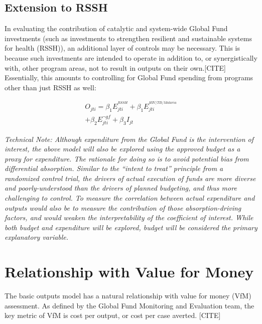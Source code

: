 \documentclass[twocolumn]{bmcart}%
\begin{document}
\subsection{Extension to RSSH}
In evaluating the contribution of catalytic and system-wide Global Fund investments (such as investments to strengthen resilient and sustainable systems for health (RSSH)), an additional layer of controls may be necessary. This is because such investments are intended to operate in addition to, or synergistically with, other program areas, not to result in outputs on their own.[CITE] %
 Essentially, this amounts to controlling for Global Fund spending from programs other than just RSSH as well:

  \begin{align}
    O_{jti} = \beta_1 E^{^{RSSH}}_{jti} + \beta_1 E^{^{HIV/TB/Malaria}}_{jti} \\
    + \beta_2 E^{\neg gf}_{jti} + \beta_3 I_{jt}
  \end{align}

\textit{Technical Note: Although expenditure from the Global Fund is the intervention of interest, the above model will also be explored using the approved budget as a proxy for expenditure. The rationale for doing so is to avoid potential bias from differential absorption. Similar to the ``intent to treat'' principle from a randomized control trial, the drivers of actual execution of funds are more diverse and poorly-understood than the drivers of planned budgeting, and thus more challenging to control. To measure the correlation between actual expenditure and outputs would also be to measure the contribution of those absorption-driving factors, and would weaken the interpretability of the coefficient of interest. While both budget and expenditure will be explored, budget will be considered the primary explanatory variable.}


\section{Relationship with Value for Money} \label{vfm}
The basic outputs model has a natural relationship with value for money (VfM) assessment. As defined by the Global Fund Monitoring and Evaluation team, the key metric of VfM is cost per output, or cost per case averted. [CITE] \\
\end{document}
